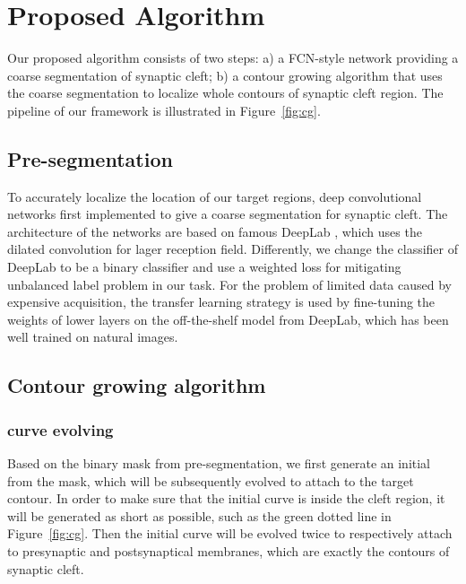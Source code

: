 \section{Proposed Algorithm}
\label{sec:algorithm}


Our proposed algorithm consists of two steps:
a) a FCN-style network providing a coarse segmentation of synaptic cleft;
b) a contour growing algorithm that uses the coarse segmentation to localize whole contours of synaptic cleft region.
The pipeline of our framework is illustrated in Figure~\ref{fig:cg}.

\subsection{Pre-segmentation}

To accurately localize the location of our target regions, deep convolutional networks  first implemented to give a coarse segmentation for synaptic cleft.
The architecture of the networks are based on famous DeepLab \cite{Chen2016a}, which uses the dilated convolution for lager reception field.
%
Differently, we change the classifier of DeepLab to be a binary classifier and use a weighted loss for mitigating unbalanced label problem in our task.
For the problem of limited data caused by expensive acquisition, the transfer learning strategy is used by fine-tuning the weights of lower layers on the off-the-shelf model from DeepLab, which has been well trained on natural images.

\subsection{Contour growing algorithm}
\subsubsection{curve evolving}
\label{sec:curve_evolving}

Based on the binary mask from pre-segmentation, we first generate an initial  from the mask, which will be subsequently evolved to attach to the target contour.
%
In order to make sure that the initial curve is inside the cleft region, it will be generated as short as possible, such as the green dotted line in Figure~\ref{fig:cg}.
Then the initial curve will be evolved twice to respectively attach to presynaptic and postsynaptical membranes, which are exactly the contours of synaptic cleft.

